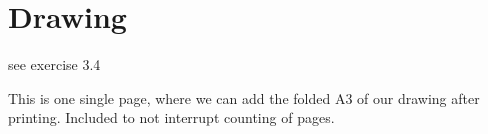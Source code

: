 \chapter{Drawing}

see exercise 3.4


\clearpage
This is one single page, where we can add the folded A3 of our drawing after printing.
Included to not interrupt counting of pages.
\newpage